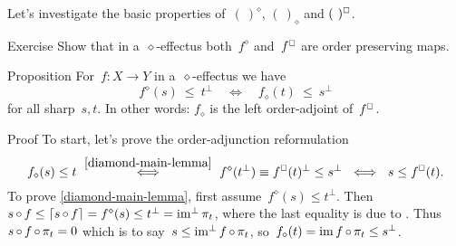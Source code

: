 \documentclass[b]{subfiles}
\begin{document}
\begin{parsec}%
\begin{point}%
Let's investigate the basic properties of~$(\ )^\diamond$, $(\ )_\diamond$
    and $(\ )^\BOX$.
\end{point}
\begin{point}{Exercise}%
Show that in a~$\diamond$-effectus
    both~$f^\diamond$ and~$f^\BOX$ are order preserving maps.
\end{point}
\begin{point}{Proposition}%
For~$f\colon X \to Y$ in a~$\diamond$-effectus we have
\begin{equation}
    f^\diamond(s) \ \leq\  t^\perp
    \quad \iff
    \quad f_\diamond(t) \ \leq\  s^\perp \label{diamond-main-lemma}
\end{equation}
for all sharp~$s,t$.
In other words: $f_\diamond$ is the left order-adjoint of~$f^\BOX$.
\begin{point}{Proof}%
To start, let's prove the order-adjunction reformulation
\begin{equation*}
    f_\diamond(s) \leq t
    \ \overset{\eqref{diamond-main-lemma}}{\iff} \ 
    f^\diamond(t^\perp) \equiv f^\BOX(t)^\perp \leq s^\perp
            \ \iff \
    s \leq f^\BOX(t).
\end{equation*}
To prove \eqref{diamond-main-lemma},
first assume~$f^\diamond(s) \leq t^\perp$.
Then~$s \mathop{\circ} f \leq \left\lceil s \mathop{\circ} f\right\rceil = f^\diamond(s) \leq t^\perp
= \operatorname{im^\perp} \pi_t$, where the last equality is
due to \sref{img-of-compr}.
Thus~$s \mathop{\circ} f \mathop{\circ} \pi_t = 0$
    which is to say~$s \leq \operatorname{im^\perp} f \mathop{\circ} \pi_t$,
    so~$f_\diamond(t) = \operatorname{im} f \mathop{\circ} \pi_t \leq s^\perp$.


\end{point}
\end{point}
\end{parsec}
\end{document}
